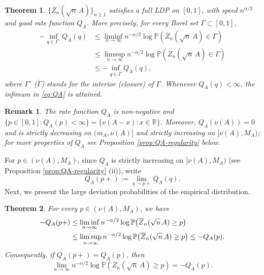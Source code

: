 \documentclass[a4paper, 11pt]{article}
\newcommand{\1}{\mathbf 1}
\theoremstyle{plain}
\newtheorem{theorem}{Theorem}[section]
\newtheorem{remark}{Remark}[section]
\begin{document}
\begin{theorem}\label{thm:empirical-LDP}
\(\{\overline Z_n(\sqrt n\,A)\}_{n\geq1}\) satisfies a full LDP on \([0,1]\), with speed \(n^{\alpha/2}\) and good rate function \(Q_A\). More precisely, for every Borel set
\(\Gamma\subset[0,1]\),
\begin{align*}
  -\inf_{q\in\Gamma^\circ}Q_A(q)
  &\leq
  \liminf_{n\to\infty}n^{-\alpha/2}
  \log\mathbb{P}\!\left(\overline Z_n(\sqrt n\,A)\in\Gamma\right)\\
  &\leq
  \limsup_{n\to\infty}n^{-\alpha/2}
  \log\mathbb{P}\!\left(\overline Z_n(\sqrt n\,A)\in\Gamma\right)\\
  &\leq
  -\inf_{q\in\overline\Gamma}Q_A(q),
\end{align*}
where $\Gamma^\circ$ ($\overline\Gamma$) stands for the interior (closure) of $\Gamma$. Whenever \(Q_A(q)<\infty\), the infimum in \eqref{eq:QA} is attained.
\end{theorem}
\begin{remark}The rate function $Q_A$ is non-negative and $\{p\in[0,1]: Q_A(p)<\infty\}=\{\nu(A-x):x\in\mathbb{R}\}$.  Moreover, $Q_A(\nu(A))=0$ and is strictly decreasing on $(m_A,\nu(A)]$ and strictly increasing on $[\nu(A),M_A)$; for more properties of $Q_A$ see Proposition \ref{prop:QA-regularity} below.
\end{remark}
For \(p\in(\nu(A),M_A)\), since $Q_A$ is strictly increasing on $[\nu(A),M_A)$ (see Proposition \ref{prop:QA-regularity} (ii)), write
\begin{equation}
  Q_A(p+):=\lim_{q\to p+}Q_A(q).
\end{equation}
Next, we present the large deviation probabilities of the empirical distribution.

\begin{theorem}
\label{thm:main-one-sided}
For every $p\in(\nu(A),M_A)$, we have
\begin{align}
  -Q_A(p+)
  &\leq
  \liminf_{n\to\infty}n^{-\alpha/2}
  \log\mathbb{P}\!\left(\overline Z_n(\sqrt n\,A)\geq p\right)
  \notag\\
  &\leq
  \limsup_{n\to\infty}n^{-\alpha/2}
  \log\mathbb{P}\!\left(\overline Z_n(\sqrt n\,A)\geq p\right)
  \leq -Q_A(p).\nonumber
\end{align}
Consequently, if \(Q_A(p+)=Q_A(p)\), then
\[
  \lim_{n\to\infty}n^{-\alpha/2}
  \log\mathbb{P}\!\left(\overline Z_n(\sqrt n\,A)\geq p\right)
  =-Q_A(p).
\]
\end{theorem}
\end{document}
